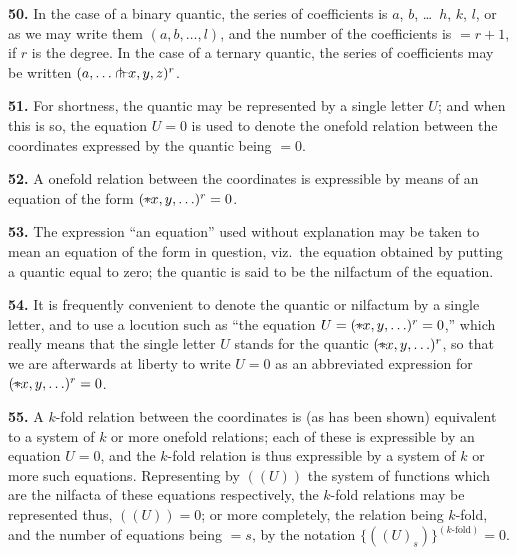 \documentclass[11pt,a4paper]{article}
\theoremstyle{definition}
\begin{document}
\noindent\textbf{50.} In the case of a binary quantic, the series of coefficients is $a$, $b$, \ldots\ $h$, $k$, $l$, or as we may write them $(a,b,\ldots,l)$, and the number of the coefficients is $=r+1$, if $r$ is the degree. In the case of a ternary quantic, the series of coefficients may be written $(a,\ldots\pitchfork\!\hbox{\hspace{-0.5em}}\raisebox{0.3ex}{$\scriptstyle\frown$}\!x,y,z)^r$.

\noindent\textbf{51.} For shortness, the quantic may be represented by a single letter $U$; and when this is so, the equation $U=0$ is used to denote the onefold relation between the coordinates expressed by the quantic being $=0$.

\noindent\textbf{52.} A onefold relation between the coordinates is expressible by means of an equation of the form $({*}\!\hbox{\hspace{-0.5em}}\raisebox{0.3ex}{$\scriptstyle\frown$}\!x,y,\ldots)^r=0$.

\noindent\textbf{53.} The expression ``an equation'' used without explanation may be taken to mean an equation of the form in question, viz.\ the equation obtained by putting a quantic equal to zero; the quantic is said to be the nilfactum of the equation.

\noindent\textbf{54.} It is frequently convenient to denote the quantic or nilfactum by a single letter, and to use a locution such as ``the equation $U=({*}\!\hbox{\hspace{-0.5em}}\raisebox{0.3ex}{$\scriptstyle\frown$}\!x,y,\ldots)^r=0$,'' which really means that the single letter $U$ stands for the quantic $({*}\!\hbox{\hspace{-0.5em}}\raisebox{0.3ex}{$\scriptstyle\frown$}\!x,y,\ldots)^r$, so that we are afterwards at liberty to write $U=0$ as an abbreviated expression for $({*}\!\hbox{\hspace{-0.5em}}\raisebox{0.3ex}{$\scriptstyle\frown$}\!x,y,\ldots)^r=0$.

\noindent\textbf{55.} A $k$-fold relation between the coordinates is (as has been shown) equivalent to a system of $k$ or more onefold relations; each of these is expressible by an equation $U=0$, and the $k$-fold relation is thus expressible by a system of $k$ or more such equations. Representing by $((U))$ the system of functions which are the nilfacta of these equations respectively, the $k$-fold relations may be represented thus, $((U))=0$; or more completely, the relation being $k$-fold, and the number of equations being $=s$, by the notation $\{((U)_s)\}^{(k\text{-fold})}=0$.
\end{document}
